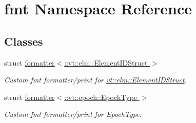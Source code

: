 \hypertarget{namespacefmt}{}\section{fmt Namespace Reference}
\label{namespacefmt}
\subsection*{Classes}
\begin{DoxyCompactItemize}
\item 
struct \hyperlink{structfmt_1_1formatter_3_1_1vt_1_1elm_1_1_element_i_d_struct_01_4}{formatter$<$\+::vt\+::elm\+::\+Element\+I\+D\+Struct $>$}
\begin{DoxyCompactList}\small\item\em Custom fmt formatter/print for {\ttfamily \hyperlink{structvt_1_1elm_1_1_element_i_d_struct}{vt\+::elm\+::\+Element\+I\+D\+Struct}}. \end{DoxyCompactList}\item 
struct \hyperlink{structfmt_1_1formatter_3_1_1vt_1_1epoch_1_1_epoch_type_01_4}{formatter$<$\+::vt\+::epoch\+::\+Epoch\+Type $>$}
\begin{DoxyCompactList}\small\item\em Custom fmt formatter/print for {\ttfamily Epoch\+Type}. \end{DoxyCompactList}\end{DoxyCompactItemize}
